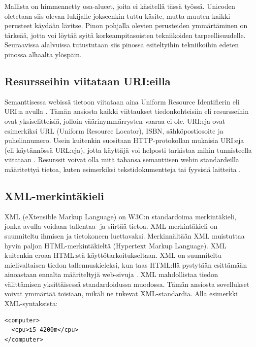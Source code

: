 \documentclass[finnish, 12pt, a4paper, elec, utf8, pdfa, online]{aaltothesis}
\begin{document}
Mallista on himmennetty osa-alueet, joita ei käsitellä tässä työssä. Unicoden oletetaan siis olevan lukijalle jokseenkin tuttu käsite, mutta muuten kaikki perusteet käydään lävitse. Pinon pohjalla olevien perusteiden ymmärtäminen on tärkeää, jotta voi löytää syitä korkeampitasoisten tekniikoiden tarpeellisuudelle. Seuraavissa alalvuissa tutustutaan siis pinossa esiteltyihin tekniikoihin edeten pinossa alhaalta ylöspäin.

\subsection{Resursseihin viitataan URI:eilla}
Semanttisessa webissä tietoon viitataan aina Uniform Resource Identifierin eli URI:n avulla \cite{RDF_specification}. Tämän ansiosta kaikki viittaukset tiedonkohteisiin eli resursseihin ovat yksiselitteisiä, jolloin väärinymmärrysten vaaraa ei ole. URI:eja ovat esimerkiksi URL (Uniform Resource Locator), ISBN, sähköpostiosoite ja puhelinnumero. Usein kuitenkin suositaan HTTP-protokollan mukaisia URI:eja (eli käytännössä URL:eja), jotta käyttäjä voi helposti tarkistaa mihin tunnisteella viitataan \cite{cambridge_linked}. Resurssit voivat olla mitä tahansa semanttisen webin standardeilla määritettyä tietoa, kuten esimerkiksi tekstidokumentteja tai fyysisiä laitteita \cite{RDF_specification}.

\subsection{XML-merkintäkieli}
XML (eXtensible Markup Language) on W3C:n standardoima merkintäkieli, jonka avulla voidaan tallentaa- ja siirtää tietoa. XML-merkintäkieli on suunniteltu ihmisen ja tietokoneen luettavaksi. Merkinnältään XML muistuttaa hyvin paljon HTML-merkintäkieltä (Hypertext Markup Language). XML kuitenkin eroaa HTML:stä käyttötarkoitukseltaan. XML on suunniteltu mielivaltaisen tiedon tallennuskieleksi, kun taas HTML:llä pystytään esittämään ainoastaan ennalta määriteltyjä web-sivuja \cite{IEEE_XML}. XML mahdollistaa tiedon välittämisen yksittäisessä standardoidussa muodossa. Tämän ansiosta sovellukset voivat ymmärtää toisiaan, mikäli ne tukevat XML-standardia. Alla esimerkki XML-syntaksista:
\vspace{0.3cm}
\begin{lstlisting}[style=codeblock,caption={XML-syntaksiesimerkki.},captionpos=b,label={xml-esim}]
<computer>
  <cpu>i5-4200m</cpu>
</computer>
\end{lstlisting}
\end{document}
